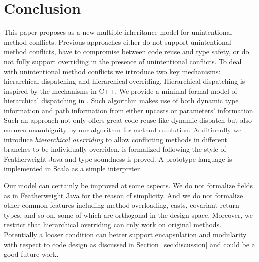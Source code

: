 \section{Conclusion}


This paper proposes \MIM{} as a new multiple inheritance model for
unintentional method conflicts. Previous approaches 
either do not support unintentional method conflicts, have to
compromise between code reuse and type safety, or do not fully support
overriding in the presence of unintentional conflicts. To deal with unintentional method conflicts we
introduce two key mechanisms: hierarchical dispatching and
hierarchical overriding. Hierarchical dispatching is inspired by the
mechanisms in C++. We provide a minimal formal model of hierarchical
dispatching in \MIM{}. Such algorithm makes use of both dynamic type
information and path information from either upcasts or parameters'
information. Such an approach not only offers great code reuse like
dynamic dispatch but also ensures unambiguity by our algorithm for
method resolution. Additionally we introduce \emph{hierarchical
  overriding} to allow conflicting methods in different branches to be
individually overriden. \MIM{} is formalized following the style of
Featherweight Java and type-soundness is proved. A prototype language is
implemented in Scala as a simple interpreter.

Our model can certainly be improved at some aspects. We do not
formalize fields as in Featherweight Java for the reason of
simplicity. And we do not formalize other common features including
method overloading, casts, covariant return types, and so on, some of
which are orthogonal in the design space. Moreover, we restrict that
hierarchical overriding can only work on original methods. Potentially
a looser condition can better support encapsulation and modularity
with respect to code design as discussed in
Section~\ref{sec:discussion} and could be a good future work.
